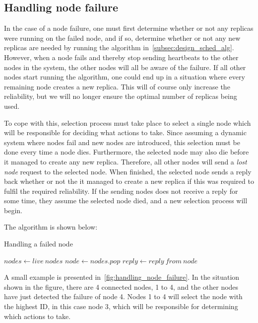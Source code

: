 \documentclass{cslthse-msc}
\begin{document}
\subsection{Handling node failure} \label{subsec:design_handling_failure}
In the case of a node failure, one must first determine whether or not any replicas were running on the failed node, and if so, determine whether or not any new replicas are needed by running the algorithm in~\autoref{subsec:design_sched_alg}. However, when a node fails and thereby stop sending heartbeats to the other nodes in the system, the other nodes will all be aware of the failure. If all other nodes start running the algorithm, one could end up in a situation where every remaining node creates a new replica. This will of course only increase the reliability, but we will no longer ensure the optimal number of replicas being used. 

To cope with this, selection process must take place to select a single node which will be responsible for deciding what actions to take. Since assuming a dynamic system where nodes fail and new nodes are introduced, this selection must be done every time a node dies. Furthermore, the selected node may also die before it managed to create any new replica. Therefore, all other nodes will send a \emph{lost node} request to the selected node. When finished, the selected node sends a reply back whether or not the it managed to create a new replica if this was required to fulfil the required reliability. If the sending nodes does not receive a reply for some time, they assume the selected node died, and a new selection process will begin.

The algorithm is shown below:

\begin{algorithm}\label{alg:node_failure}
	\caption{Handling a failed node}
	\begin{algorithmic}[1]
	\State $nodes\gets live\ nodes$
	\Do
		\State $node\gets nodes.pop$
		\State
		\State $reply\gets reply\ from\ node$
	\end{algorithmic}
\end{algorithm}

A small example is presented in~\autoref{fig:handling_node_failure}. In the situation shown in the figure, there are 4 connected nodes, 1 to 4, and the other nodes have just detected the failure of node 4. Nodes 1 to 4 will select the node with the highest ID, in this case node 3, which will be responsible for determining which actions to take.
\end{document}
